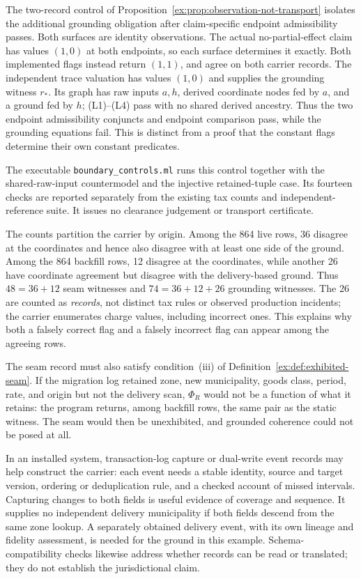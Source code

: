 \documentclass[11pt]{article}
\theoremstyle{definition}
\newcommand{\code}[1]{\texttt{#1}}
\begin{document}
The two-record control of Proposition~\ref{ex:prop:observation-not-transport} isolates the additional grounding obligation after claim-specific endpoint admissibility passes. Both surfaces are identity observations. The actual no-partial-effect claim has values $(1,0)$ at both endpoints, so each surface determines it exactly. Both implemented flags instead return $(1,1)$, and agree on both carrier records. The independent trace valuation has values $(1,0)$ and supplies the grounding witness $r_*$. Its graph has raw inputs $a,h$, derived coordinate nodes fed by $a$, and a ground fed by $h$; (L1)--(L4) pass with no shared derived ancestry. Thus the two endpoint admissibility conjuncts and endpoint comparison pass, while the grounding equations fail. This is distinct from a proof that the constant flags determine their own constant predicates.

The executable \code{boundary\_\allowbreak{}controls.ml} runs this control together with the shared-raw-input countermodel and the injective retained-tuple case. Its fourteen checks are reported separately from the existing tax counts and independent-reference suite. It issues no clearance judgement or transport certificate.

The counts partition the carrier by origin. Among the 864 live rows, 36 disagree at the coordinates and hence also disagree with at least one side of the ground. Among the 864 backfill rows, 12 disagree at the coordinates, while another 26 have coordinate agreement but disagree with the delivery-based ground. Thus $48=36+12$ seam witnesses and $74=36+12+26$ grounding witnesses. The 26 are counted as \emph{records}, not distinct tax rules or observed production incidents; the carrier enumerates charge values, including incorrect ones. This explains why both a falsely correct flag and a falsely incorrect flag can appear among the agreeing rows.

The seam record must also satisfy condition~(iii) of Definition~\ref{ex:def:exhibited-seam}. If the migration log retained zone, new municipality, goods class, period, rate, and origin but not the delivery scan, $\Phi_R$ would not be a function of what it retains: the program returns, among backfill rows, the same pair as the static witness. The seam would then be unexhibited, and grounded coherence could not be posed at all.

In an installed system, transaction-log capture or dual-write event records may help construct the carrier: each event needs a stable identity, source and target version, ordering or deduplication rule, and a checked account of missed intervals. Capturing changes to both fields is useful evidence of coverage and sequence. It supplies no independent delivery municipality if both fields descend from the same zone lookup. A separately obtained delivery event, with its own lineage and fidelity assessment, is needed for the ground in this example. Schema-compatibility checks likewise address whether records can be read or translated; they do not establish the jurisdictional claim.
\end{document}
